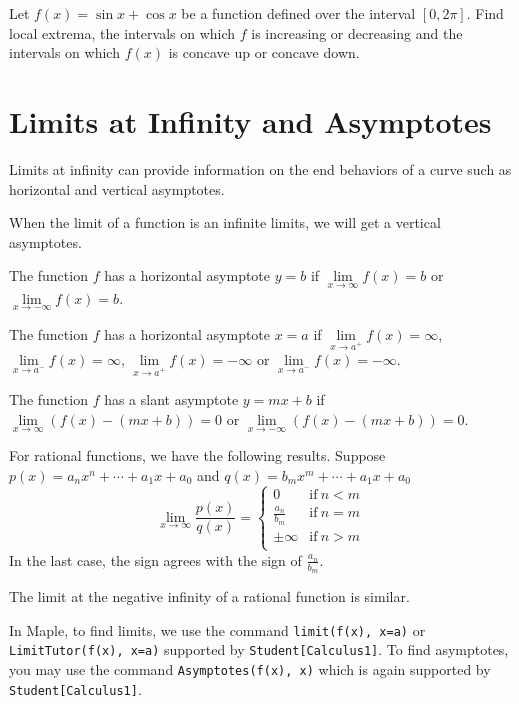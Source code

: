 \documentclass[
  en,11pt,simple]{elegantbook}
\newcommand{\size}[2]{{\fontsize{#1}{0}\selectfont#2}}
\renewenvironment{exercise}[1][]{
    \refstepcounter{exer}
    \par\noindent
    \makebox[-3pt][r]{\color{red!90}\size{12}{\HandPencilLeft}}
	\textbf{\color{main}{\exercisename} \theexer #1}
    \rmfamily
}{\par\ignorespacesafterend}
\begin{document}
\begin{exercise}

Let \(f(x)=\sin x+\cos x\) be a function defined over the interval \([0, 2\pi]\). Find local extrema, the intervals on which \(f\) is increasing or decreasing and the intervals on which \(f(x)\) is concave up or concave down.
\end{exercise}

\hypertarget{limits-at-infinity-and-asymptotes}{%
\section{Limits at Infinity and Asymptotes}\label{limits-at-infinity-and-asymptotes}}

Limits at infinity can provide information on the end behaviors of a curve such as horizontal and vertical asymptotes.

When the limit of a function is an infinite limits, we will get a vertical asymptotes.

The function \(f\) has a horizontal asymptote \(y = b\) if \(\lim\limits_{x\to \infty}f(x)=b\) or \(\lim\limits_{x\to -\infty}f(x)=b\).

The function \(f\) has a horizontal asymptote \(x = a\) if \(\lim\limits_{x\to a^+}f(x)=\infty\), \(\lim\limits_{x\to a^-}f(x)=\infty\), \(\lim\limits_{x\to a^+}f(x)=-\infty\) or \(\lim\limits_{x\to a^-}f(x)=-\infty\).

The function \(f\) has a slant asymptote \(y = mx + b\) if \(\lim\limits_{x\to \infty}(f(x)-(mx+b))=0\) or \(\lim\limits_{x\to -\infty}(f(x)-(mx+b))=0\).

For rational functions, we have the following results.
Suppose \(p(x)=a_nx^n+\cdots +a_1x+ a_0\) and \(q(x)=b_mx^m+\cdots +a_1x+ a_0\)
\[
\lim\limits_{x\to \infty}\frac{p(x)}{q(x)}=
\begin{cases}
    0 & \text{if}~ n<m\\
    \frac{a_n}{b_m} & \text{if}~ n=m\\
    \pm\infty & \text{if}~ n>m\\
\end{cases}
\]
In the last case, the sign agrees with the sign of \(\frac{a_n}{b_m}\).

The limit at the negative infinity of a rational function is similar.

In Maple, to find limits, we use the command \texttt{limit(f(x),\ x=a)} or \texttt{LimitTutor(f(x),\ x=a)} supported by \texttt{Student{[}Calculus1{]}}. To find asymptotes, you may use the command \texttt{Asymptotes(f(x),\ x)} which is again supported by \texttt{Student{[}Calculus1{]}}.
\end{document}
